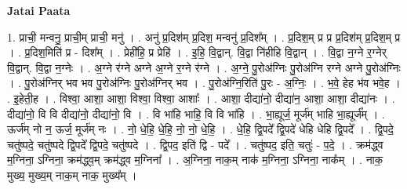 \documentclass[17pt]{extarticle}
\begin{document}
\textbf{Jatai Paata} \newline

1. प्राची॒ मन्वनु॒ प्राची॒म् प्राची॒ मनु॑ । . अनु॑ प्र॒दिश॑म् प्र॒दिश॒ मन्वनु॑ प्र॒दिश᳚म् । . प्र॒दिश॒म् प्र प्र प्र॒दिश॑म् प्र॒दिश॒म् प्र । . प्र॒दिश॒मिति॑ प्र - दिश᳚म् । . प्रेही॑हि॒ प्र प्रेहि॑ । . इ॒हि॒ वि॒द्वान्. वि॒द्वा नि॑हीहि वि॒द्वान् । . वि॒द्वा न॒ग्ने र॒ग्नेर् वि॒द्वान्. वि॒द्वा न॒ग्नेः । . अ॒ग्ने र॑ग्ने अग्ने अ॒ग्ने र॒ग्ने र॑ग्ने । . अ॒ग्ने॒ पु॒रोअ॑ग्निः पु॒रोअ॑ग्नि रग्ने अग्ने पु॒रोअ॑ग्निः । . पु॒रोअ॑ग्निर् भव भव पु॒रोअ॑ग्निः पु॒रोअ॑ग्निर् भव । . पु॒रोअ॑ग्नि॒रिति॑ पु॒रः - अ॒ग्निः॒ । . भ॒वे॒ हेह भ॑व भवे॒ह । . इ॒हेती॒ह । . विश्वा॒ आशा॒ आशा॒ विश्वा॒ विश्वा॒ आशाः᳚ । . आशा॒ दीद्या॑नो॒ दीद्या॑न॒ आशा॒ आशा॒ दीद्या॑नः । . दीद्या॑नो॒ वि वि दीद्या॑नो॒ दीद्या॑नो॒ वि । . वि भा॑हि भाहि॒ वि वि भा॑हि । . भा॒ह्यूर्ज॒ मूर्ज॑म् भाहि भा॒ह्यूर्ज᳚म् । . ऊर्ज॑म् नो न॒ ऊर्ज॒ मूर्ज॑म् नः । . नो॒ धे॒हि॒ धे॒हि॒ नो॒ नो॒ धे॒हि॒ । . धे॒हि॒ द्वि॒पदे᳚ द्वि॒पदे॑ धेहि धेहि द्वि॒पदे᳚ । . द्वि॒पदे॒ चतु॑ष्पदे॒ चतु॑ष्पदे द्वि॒पदे᳚ द्वि॒पदे॒ चतु॑ष्पदे । . द्वि॒पद॒ इति॑ द्वि - पदे᳚ । . चतु॑ष्पद॒ इति॒ चतुः॑ - प॒दे॒ । . क्रम॑द्ध्व म॒ग्निना॒ ऽग्निना॒ क्रम॑द्ध्व॒म् क्रम॑द्ध्व म॒ग्निना᳚ । . अ॒ग्निना॒ नाक॒म् नाक॑ म॒ग्निना॒ ऽग्निना॒ नाक᳚म् । . नाक॒ मुख्य॒ मुख्य॒म् नाक॒म् नाक॒ मुख्य᳚म् । \newline
\end{document}
